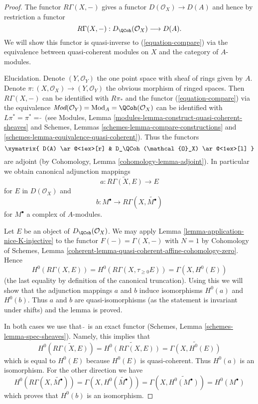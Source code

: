\begin{proof}
The functor $R\Gamma(X, -)$ gives a functor
$D(\mathcal{O}_X) \to D(A)$ and hence by restriction a functor
\begin{equation}
\label{equation-back}
R\Gamma(X, -) : D_\QCoh(\mathcal{O}_X) \longrightarrow D(A).
\end{equation}
We will show this functor is quasi-inverse to (\ref{equation-compare})
via the equivalence between quasi-coherent modules on $X$ and
the category of $A$-modules.

\medskip\noindent
Elucidation. Denote $(Y, \mathcal{O}_Y)$ the one point space with sheaf
of rings given by $A$. Denote
$\pi : (X, \mathcal{O}_X) \to (Y, \mathcal{O}_Y)$
the obvious morphism of ringed spaces.
Then $R\Gamma(X, -)$ can be identified with $R\pi_*$ and the functor
(\ref{equation-compare}) via the equivalence
$\textit{Mod}(\mathcal{O}_Y) = \text{Mod}_A = \QCoh(\mathcal{O}_X)$
can be identified with $L\pi^* = \pi^* = \widetilde{\ }$ (see
Modules, Lemma \ref{modules-lemma-construct-quasi-coherent-sheaves} and
Schemes, Lemmas \ref{schemes-lemma-compare-constructions} and
\ref{schemes-lemma-equivalence-quasi-coherent}). Thus the functors
$$
\xymatrix{
D(A) \ar@<1ex>[r] & D_\QCoh(\mathcal{O}_X) \ar@<1ex>[l]
}
$$
are adjoint (by Cohomology, Lemma \ref{cohomology-lemma-adjoint}). In
particular we obtain canonical adjunction mappings
$$
a : \widetilde{R\Gamma(X, E)} \longrightarrow E
$$
for $E$ in $D(\mathcal{O}_X)$ and
$$
b : M^\bullet \longrightarrow R\Gamma(X, \widetilde{M^\bullet})
$$
for $M^\bullet$ a complex of $A$-modules.

\medskip\noindent
Let $E$ be an object of $D_\QCoh(\mathcal{O}_X)$. We may apply
Lemma \ref{lemma-application-nice-K-injective}
to the functor $F(-) = \Gamma(X, -)$
with $N = 1$ by Cohomology of Schemes, Lemma
\ref{coherent-lemma-quasi-coherent-affine-cohomology-zero}.
Hence
$$
H^0(R\Gamma(X, E)) = H^0(R\Gamma(X, \tau_{\geq 0}E)) = \Gamma(X, H^0(E))
$$
(the last equality by definition of the canonical truncation).
Using this we will show that the adjunction mappings $a$ and $b$
induce isomorphisms $H^0(a)$ and $H^0(b)$. Thus $a$ and $b$
are quasi-isomorphisms (as the statement is invariant under shifts)
and the lemma is proved.

\medskip\noindent
In both cases we use that $\widetilde{\ }$ is an exact functor
(Schemes, Lemma \ref{schemes-lemma-spec-sheaves}). Namely, this
implies that
$$
H^0\left(\widetilde{R\Gamma(X, E)}\right) =
\widetilde{H^0(R\Gamma(X, E))} =
\widetilde{\Gamma(X, H^0(E))}
$$
which is equal to $H^0(E)$ because $H^0(E)$ is quasi-coherent. Thus
$H^0(a)$ is an isomorphism. For the other direction we have
$$
H^0(R\Gamma(X, \widetilde{M^\bullet})) =
\Gamma(X, H^0(\widetilde{M^\bullet})) =
\Gamma(X, \widetilde{H^0(M^\bullet)}) =
H^0(M^\bullet)
$$
which proves that $H^0(b)$ is an isomorphism.
\end{proof}

